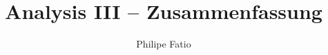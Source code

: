 \documentclass[9pt,fleqn,article]{memoir}
\title{Analysis III -- Zusammenfassung}
\author{Philipe Fatio}
\numberwithin{equation}{section}
\begin{document}
\begin{multicols*}{3}
\end{multicols*}

\appendix
\makeatletter
\def\@seccntformat#1{A.\csname the#1\endcsname\quad}
\makeatother
\begin{multicols*}{3}
\end{multicols*}
\end{document}
